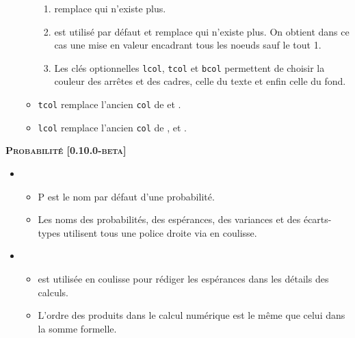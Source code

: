 \begin{itemize}[itemsep=.5em]
\begin{itemize}[itemsep=.5em]
\begin{enumerate}
        	\item {} remplace  qui n'existe plus.

        	\item {} est utilisé par défaut et remplace  qui n'existe plus. On obtient dans ce cas une mise en valeur encadrant tous les noeuds sauf le tout 1\ier{}.

        	\item Les clés optionnelles \verb#lcol#, \verb#tcol# et \verb#bcol# permettent de choisir la couleur des arrêtes et des cadres, celle du texte et enfin celle du fond.
        \end{enumerate}


        \item \verb#tcol# remplace l'ancien \verb#col# de  et .

		\item \verb#lcol# remplace l'ancien \verb#col# de ,  et .



    \end{itemize}
\end{itemize}


\begin{center}
    \textbf{\textsc{Probabilité [0.10.0-beta]}}
\end{center}

\begin{itemize}[itemsep=.5em]
    \item {}

    \begin{itemize}[itemsep=.5em]
        \item $\mathrm{P}$ est le nom par défaut d'une probabilité.

		\item Les noms des probabilités, des espérances, des variances et des écarts-types utilisent tous une police droite via  en coulisse.
    \end{itemize}




    \item {}

    \begin{itemize}[itemsep=.5em]
        \item {} est utilisée en coulisse pour rédiger les espérances dans les détails des calculs.
        
		\item L'ordre des produits dans le calcul numérique est le même que celui dans la somme formelle.
    \end{itemize}
\end{itemize}


\separation
